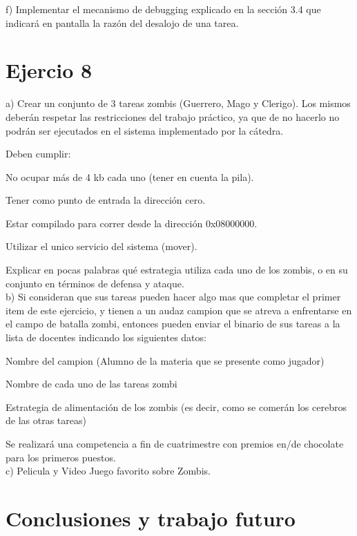 \documentclass[a4paper]{article}
\begin{document}
{\large f)} Implementar el mecanismo de debugging explicado en la secci\'on 3.4 que indicar\'a en pantalla
la raz\'on del desalojo de una tarea.


\newpage
\section{Ejercio 8}
{\large a)} Crear un conjunto de 3 tareas zombis (Guerrero, Mago y Clerigo). Los mismos deber\'an respetar
las restricciones del trabajo pr\'actico, ya que de no hacerlo no podr\'an ser ejecutados
en el sistema implementado por la c\'atedra.

Deben cumplir:

No ocupar m\'as de 4 kb cada uno (tener en cuenta la pila).

Tener como punto de entrada la direcci\'on cero.

Estar compilado para correr desde la direcci\'on 0x08000000.

Utilizar el unico servicio del sistema (mover).

Explicar en pocas palabras qu\'e estrategia utiliza cada uno de los zombis, o en su conjunto
en t\'erminos de defensa y ataque.\\

{\large b)} Si consideran que sus tareas pueden hacer algo mas que completar el primer item de este
ejercicio, y tienen a un audaz campion que se atreva a enfrentarse en el campo de batalla
zombi, entonces pueden enviar el binario de sus tareas a la lista de docentes indicando
los siguientes datos:

Nombre del campion (Alumno de la materia que se presente como jugador)

Nombre de cada uno de las tareas zombi

Estrategia de alimentaci\'on de los zombis (es decir, como se comer\'an los cerebros de
las otras tareas)

Se realizar\'a una competencia a fin de cuatrimestre con premios en/de chocolate para los
primeros puestos. \\

{\large c)} Pelicula y Video Juego favorito sobre Zombis.


\newpage
\section{Conclusiones y trabajo futuro}
\end{document}

